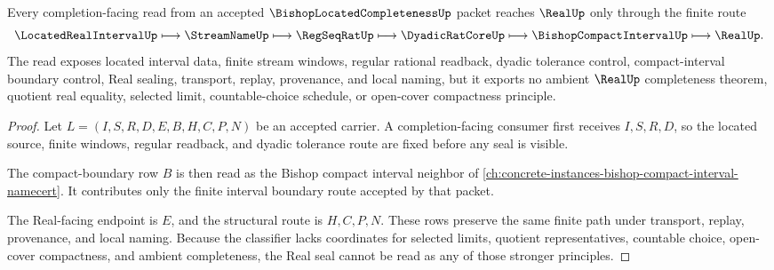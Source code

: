 \begin{theorem}
\label{thm:bishop-located-completeness-real-seal-boundary}
Every completion-facing read from an accepted $\BishopLocatedCompletenessUp$ packet reaches $\RealUp$ only through the finite route
$$
\LocatedRealIntervalUp
\longmapsto
\StreamNameUp
\longmapsto
\RegSeqRatUp
\longmapsto
\DyadicRatCoreUp
\longmapsto
\BishopCompactIntervalUp
\longmapsto
\RealUp .
$$
The read exposes located interval data, finite stream windows, regular rational readback, dyadic tolerance control, compact-interval boundary control, Real sealing, transport, replay, provenance, and local naming, but it exports no ambient $\RealUp$ completeness theorem, quotient real equality, selected limit, countable-choice schedule, or open-cover compactness principle.
\end{theorem}
\begin{proof}
Let $L=(I,S,R,D,E,B,H,C,P,N)$ be an accepted carrier. A completion-facing consumer first receives $I,S,R,D$, so the located source, finite windows, regular readback, and dyadic tolerance route are fixed before any seal is visible.

The compact-boundary row $B$ is then read as the Bishop compact interval neighbor of \autoref{ch:concrete-instances-bishop-compact-interval-namecert}. It contributes only the finite interval boundary route accepted by that packet.

The Real-facing endpoint is $E$, and the structural route is $H,C,P,N$. These rows preserve the same finite path under transport, replay, provenance, and local naming. Because the classifier lacks coordinates for selected limits, quotient representatives, countable choice, open-cover compactness, and ambient completeness, the Real seal cannot be read as any of those stronger principles.
\end{proof}



